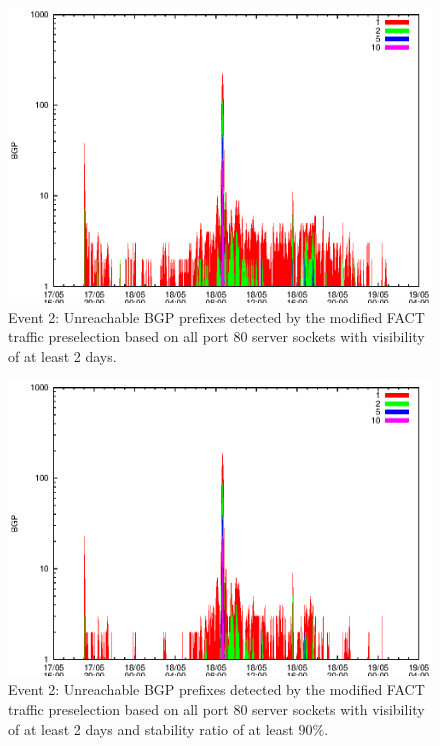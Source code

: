 \begin{figure}
	[p] \centering 
	\includegraphics[width=0.75\linewidth]{images/events/2010_05_18/bgp_log_port80_Set_stab_0_vts_2.eps}
	\caption{Event 2: Unreachable BGP prefixes detected by the modified FACT traffic preselection based on all port 80 server sockets with visibility of at least 2 days.} 
	\label{fig:TIER1_FACT_allSES80VTS2} 
\end{figure}

\begin{figure}
	[p] \centering 
	\includegraphics[width=0.75\linewidth]{images/events/2010_05_18/bgp_log_port80_Set_stab_9_vts_2.eps}
	\caption{Event 2: Unreachable BGP prefixes detected by the modified FACT traffic preselection based on all port 80 server sockets with visibility of at least 2 days and stability ratio of at least $90\%$.} 
	\label{fig:TIER1_FACT_allSES80VTS2STAB9} 
\end{figure}

